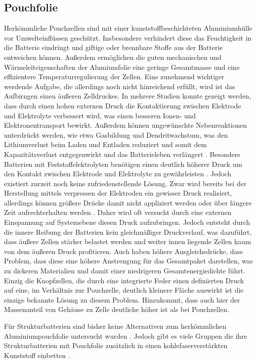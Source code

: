 \subsection{Pouchfolie}
Herkömmliche Pouchzellen sind mit einer kunststoffbeschichteten Aluminiumhülle vor Umwelteinflüssen geschützt. Insbesondere verhindert diese das Feuchtigkeit in die Batterie eindringt und giftige oder brennbare Stoffe aus der Batterie entweichen können. Außerdem ermöglichen die guten mechanischen und Wärmeleiteigenschaften der Alumiumfolie eine geringe Gesamtmasse und eine effizientere Temperaturregulierung der Zellen. Eine zunehmend wichtiger werdende Aufgabe, die allerdings noch nicht hinreichend erfüllt, wird ist das Aufbirngen einen äußeren Zelldruckes.
In mehrere Studien konnte gezeigt werden, dass durch einen hohen externen Druck die Kontaktierung zwischen Elektrode und Elektrolyte verbessert wird, was einen besseren Ionen- und Elektronentransport bewirkt. Außerdem können ungewünschte Nebenreaktionen unterdrückt werden, wie etwa Gasbildung und Dendritwachstum, was den Lithiumverlust beim Laden und Entladen reduziert und somit dem Kapazitätsverlust entgegenwirkt und das Batterieleben verlängert \cite{Mussa2018,Mueller2019,Sakamoto2019}.
Besonders Batterien mit Feststoffelektrolyten benötigen einen deutlich höherer Druck um den Kontakt zwischen Elektrode und Elektrolyte zu gewährleisten \cite{Boaretto2021}. Jedoch existiert zurzeit noch keine zufriedenstellende Lösung. Zwar wird bereits bei der Herstellung mittels verpressen der Elektroden ein gewisser Druck realisiert, allerdings können größere Drücke damit nicht appliziert werden oder über längere Zeit aufrechterhalten werden \cite{Garayt2023}. Daher wird oft versucht durch eine externen Einspannung auf Systemebene diesen Druck aufzubringen. Jedoch entsteht durch die innere Reibung der Batterien kein gleichmäßiger Druckverlauf, was dazuführt, dass äußere Zellen stärker belastet werden und weiter innen liegende Zellen kaum von dem äußeren Druck profitieren. Auch haben höhere Ausgleichsdrücke, dass Problem, dass diese eine höhere Anstrengung für das Gesamtpaket darstellen, was zu dickeren Materialien und damit einer niedrigeren Gesamtenergiedichte führt.
Einzig die Knopfzellen, die durch eine integrierte Feder einen definierten Druck auf eine, im Verhältnis zur Pouchzelle, deutlich kleinere Fläche auswirkt ist die einzige bekannte Lösung zu diesem Problem. Hinzukommt, dass auch hier der Massenanteil von Gehäuse zu Zelle deutliche höher ist als bei Pouchzellen.

Für Strukturbatterien sind bisher keine Alternativen zum herkömmlichen Aluminiumpouchfolie untersucht wurden \cite{Ye2024}. Jedoch gibt es viele Gruppen die ihre Strukturbatterien mit Pouchfolie zusätzlich in einen kohlefaserverstärkten Kunststoff einbetten \cite{Pattarakunnan2020,Asp2021}. 


